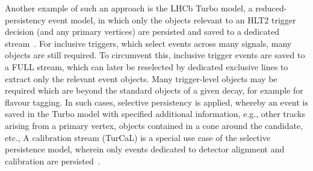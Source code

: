 Another example of such an approach is the LHCb Turbo model, a reduced-persistency event model, in which only the objects relevant to an HLT2 trigger decision (and any primary vertices) are persisted and saved to a dedicated stream~\cite{Aaij:2016rxn}. For inclusive triggers, which select events across many signals, many objects are still required. To circumvent this, inclusive trigger events are saved to a FULL stream, which can later be reselected by dedicated exclusive lines to extract only the relevant event objects. Many trigger-level objects may be required which are beyond the standard objects of a given decay, for example for flavour tagging. In such cases, selective persistency is applied, whereby an event is saved in the Turbo model with specified additional information, e.g., other tracks arising from a primary vertex, objects contained in a cone around the candidate, etc., A calibration stream (TurCaL) is a special use case of the selective persistence model, wherein only events dedicated to detector alignment and calibration are persisted~\cite{Aaij:2019uij}. %




